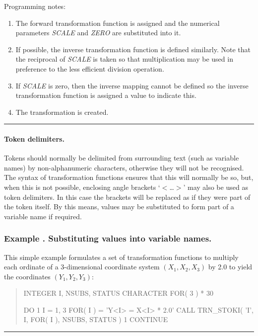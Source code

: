 \documentclass[twoside,nolof,11pt]{starlink}
\providecommand{\fortvar}[1]{\emph{#1}}
\newcounter{examplecounter}
\providecommand{\example}[1]{\addtocounter{examplecounter}{1}
                         \subsubsection*{Example \theexamplecounter. #1}}
\providecommand{\exampledone}[0]{\begin{center} \rule{6em}{0.2mm} \end{center}}
\begin{document}
Programming notes:

\begin{enumerate}

\item The forward transformation function is assigned and the numerical
parameters \fortvar{SCALE} and \fortvar{ZERO} are substituted into it.

\item If possible, the inverse transformation function is defined similarly.
Note that the reciprocal of \fortvar{SCALE} is taken so that multiplication
may be used in preference to the less efficient division operation.

\item If \fortvar{SCALE} is zero, then the inverse mapping cannot be defined
so the inverse transformation function is assigned a value to indicate this.

\item The transformation is created.

\end{enumerate}
\exampledone

\paragraph{Token delimiters.}
Tokens should normally be delimited from surrounding text (such as variable
names) by non-alphanumeric characters, otherwise they will not be
recognised.
The syntax of transformation functions ensures that this will normally be
so, but, when this is not possible, enclosing angle brackets `$<$\ldots $>$'
may also be used as token delimiters.
In this case the brackets will be replaced as if they were part of the token
itself.
By this means, values may be substituted to form part of a variable name if
required.

\example{Substituting values into variable names.}
This simple example formulates a set of transformation functions to multiply
each ordinate of a 3-dimensional coordinate system \mbox{$(X_1,X_2,X_3)$} by
2.0 to yield the coordinates \mbox{$(Y_1,Y_2,Y_3)$}:

\begin{quote}
\begin{terminalv}
       INTEGER I, NSUBS, STATUS
       CHARACTER FOR( 3 ) * 30

       DO 1 I = 1, 3
          FOR( I ) = 'Y<I> = X<I> * 2.0'
          CALL TRN_STOKI( 'I', I, FOR( I ), NSUBS, STATUS )
     1 CONTINUE
\end{terminalv}
\end{quote}
\exampledone
\end{document}
